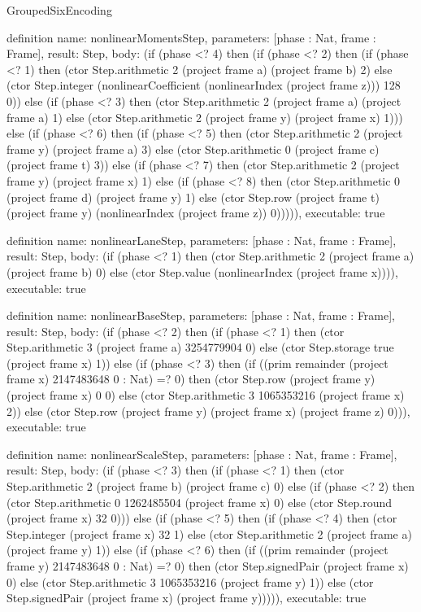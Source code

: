 \begin{lexlean}{GroupedSixEncoding}
\begin{semanticmodule}
definition{
  name: nonlinearMomentsStep,
  parameters: [phase : Nat, frame : Frame],
  result: Step,
  body: (if (phase <? 4) then (if (phase <? 2) then (if (phase <? 1) then (ctor Step.arithmetic 2 (project frame a) (project frame b) 2) else (ctor Step.integer (nonlinearCoefficient (nonlinearIndex (project frame z))) 128 0)) else (if (phase <? 3) then (ctor Step.arithmetic 2 (project frame a) (project frame a) 1) else (ctor Step.arithmetic 2 (project frame y) (project frame x) 1))) else (if (phase <? 6) then (if (phase <? 5) then (ctor Step.arithmetic 2 (project frame y) (project frame a) 3) else (ctor Step.arithmetic 0 (project frame c) (project frame t) 3)) else (if (phase <? 7) then (ctor Step.arithmetic 2 (project frame y) (project frame x) 1) else (if (phase <? 8) then (ctor Step.arithmetic 0 (project frame d) (project frame y) 1) else (ctor Step.row (project frame t) (project frame y) (nonlinearIndex (project frame z)) 0))))),
  executable: true
}

definition{
  name: nonlinearLaneStep,
  parameters: [phase : Nat, frame : Frame],
  result: Step,
  body: (if (phase <? 1) then (ctor Step.arithmetic 2 (project frame a) (project frame b) 0) else (ctor Step.value (nonlinearIndex (project frame x)))),
  executable: true
}

definition{
  name: nonlinearBaseStep,
  parameters: [phase : Nat, frame : Frame],
  result: Step,
  body: (if (phase <? 2) then (if (phase <? 1) then (ctor Step.arithmetic 3 (project frame a) 3254779904 0) else (ctor Step.storage true (project frame x) 1)) else (if (phase <? 3) then (if ((prim remainder (project frame x) 2147483648 0 : Nat) =? 0) then (ctor Step.row (project frame y) (project frame x) 0 0) else (ctor Step.arithmetic 3 1065353216 (project frame x) 2)) else (ctor Step.row (project frame y) (project frame x) (project frame z) 0))),
  executable: true
}

definition{
  name: nonlinearScaleStep,
  parameters: [phase : Nat, frame : Frame],
  result: Step,
  body: (if (phase <? 3) then (if (phase <? 1) then (ctor Step.arithmetic 2 (project frame b) (project frame c) 0) else (if (phase <? 2) then (ctor Step.arithmetic 0 1262485504 (project frame x) 0) else (ctor Step.round (project frame x) 32 0))) else (if (phase <? 5) then (if (phase <? 4) then (ctor Step.integer (project frame x) 32 1) else (ctor Step.arithmetic 2 (project frame a) (project frame y) 1)) else (if (phase <? 6) then (if ((prim remainder (project frame y) 2147483648 0 : Nat) =? 0) then (ctor Step.signedPair (project frame x) 0) else (ctor Step.arithmetic 3 1065353216 (project frame y) 1)) else (ctor Step.signedPair (project frame x) (project frame y))))),
  executable: true
}


\end{semanticmodule}
\end{lexlean}
